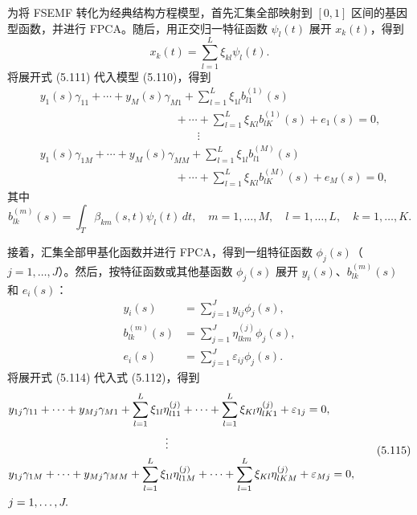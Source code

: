 为将 FSEMF 转化为经典结构方程模型，首先汇集全部映射到 $[0,1]$ 区间的基因型函数，并进行 FPCA。随后，用正交归一特征函数 $\psi_l(t)$ 展开 $x_k(t)$，得到
\begin{equation}
x_k(t)=\sum_{l=1}^L\xi_{kl}\psi_l(t).
\tag{5.111}
\end{equation}
将展开式 (5.111) 代入模型 (5.110)，得到
\begin{equation}
\begin{aligned}
&y_1(s)\gamma_{11}+\cdots+y_M(s)\gamma_{M1}
+\sum_{l=1}^L\xi_{1l}b_{l1}^{(1)}(s)\\
&\hspace{12em}+\cdots+\sum_{l=1}^L\xi_{Kl}b_{lK}^{(1)}(s)+e_1(s)=0,\\
&\hspace{14em}\vdots\\
&y_1(s)\gamma_{1M}+\cdots+y_M(s)\gamma_{MM}
+\sum_{l=1}^L\xi_{1l}b_{l1}^{(M)}(s)\\
&\hspace{12em}+\cdots+\sum_{l=1}^L\xi_{Kl}b_{lK}^{(M)}(s)+e_M(s)=0,
\end{aligned}
\tag{5.112}
\end{equation}
其中
\begin{equation}
b_{lk}^{(m)}(s)=\int_T\beta_{km}(s,t)\psi_l(t)\,dt,
\quad m=1,\ldots,M,\quad l=1,\ldots,L,\quad k=1,\ldots,K.
\tag{5.113}
\end{equation}

接着，汇集全部甲基化函数并进行 FPCA，得到一组特征函数 $\phi_j(s)$（$j=1,\ldots,J$）。然后，按特征函数或其他基函数 $\phi_j(s)$ 展开 $y_i(s)$、$b_{lk}^{(m)}(s)$ 和 $e_i(s)$：
\begin{equation}
\begin{aligned}
y_i(s)&=\sum_{j=1}^Jy_{ij}\phi_j(s),\\
b_{lk}^{(m)}(s)&=\sum_{j=1}^J\eta_{lkm}^{(j)}\phi_j(s),\\
e_i(s)&=\sum_{j=1}^J\varepsilon_{ij}\phi_j(s).
\end{aligned}
\tag{5.114}
\end{equation}
将展开式 (5.114) 代入式 (5.112)，得到
\begin{equation}
\begin{aligned}
&y_{1j}\gamma_{11}+\cdots+y_{Mj}\gamma_{M1}
+\sum_{l=1}^L\xi_{1l}\eta_{l11}^{(j)}
+\cdots+\sum_{l=1}^L\xi_{Kl}\eta_{lK1}^{(j)}+\varepsilon_{1j}=0,\\
&\hspace{14em}\vdots\\
&y_{1j}\gamma_{1M}+\cdots+y_{Mj}\gamma_{MM}
+\sum_{l=1}^L\xi_{1l}\eta_{l1M}^{(j)}
+\cdots+\sum_{l=1}^L\xi_{Kl}\eta_{lKM}^{(j)}+\varepsilon_{Mj}=0,\\
&\hfill j=1,\ldots,J.
\end{aligned}
\tag{5.115}
\end{equation}

